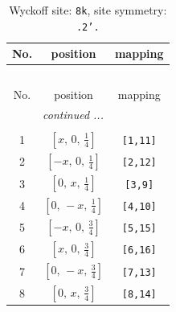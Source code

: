 \documentclass[fleqn,8pt]{jsarticle}
\begin{document}
\begin{longtable}{ccc}
\caption{Wyckoff site: {\tt 8k}, site symmetry: {\tt .2'.}}
 \\
 \hline \hline
No. & position & mapping \\ \hline \endfirsthead

\multicolumn{2}{l}{\tablename\ \thetable{}} \\
 \hline \hline
No. & position & mapping \\ \hline \endhead

 \hline \hline
\multicolumn{2}{r}{\footnotesize\it continued ...} \\ \endfoot

 \hline \hline
\multicolumn{2}{r}{} \\ \endlastfoot

1 & $\left[ x,\, 0,\, \frac{1}{4} \right]$ & {\tt [1,11]} \\ \hline
2 & $\left[ - x,\, 0,\, \frac{1}{4} \right]$ & {\tt [2,12]} \\ \hline
3 & $\left[ 0,\, x,\, \frac{1}{4} \right]$ & {\tt [3,9]} \\ \hline
4 & $\left[ 0,\, - x,\, \frac{1}{4} \right]$ & {\tt [4,10]} \\ \hline
5 & $\left[ - x,\, 0,\, \frac{3}{4} \right]$ & {\tt [5,15]} \\ \hline
6 & $\left[ x,\, 0,\, \frac{3}{4} \right]$ & {\tt [6,16]} \\ \hline
7 & $\left[ 0,\, - x,\, \frac{3}{4} \right]$ & {\tt [7,13]} \\ \hline
8 & $\left[ 0,\, x,\, \frac{3}{4} \right]$ & {\tt [8,14]} \\
\end{longtable}
\renewcommand{\arraystretch}{1.2}
\end{document}
